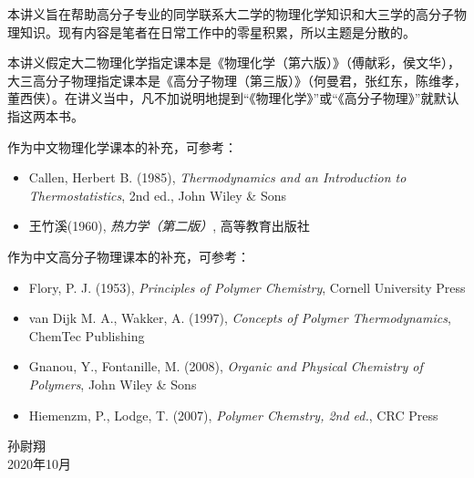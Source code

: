 \documentclass[main.tex]{subfiles}
\begin{document}
本讲义旨在帮助高分子专业的同学联系大二学的物理化学知识和大三学的高分子物理知识。现有内容是笔者在日常工作中的零星积累，所以主题是分散的。

本讲义假定大二物理化学指定课本是《物理化学（第六版）》（傅献彩，侯文华），大三高分子物理指定课本是《高分子物理（第三版）》（何曼君，张红东，陈维孝，董西侠）。在讲义当中，凡不加说明地提到“《物理化学》”或“《高分子物理》”就默认指这两本书。

作为中文物理化学课本的补充，可参考：
\begin{itemize}
\item Callen, Herbert B. (1985), \emph{Thermodynamics and an Introduction to Thermostatistics}, 2nd ed., John Wiley \& Sons
\item 王竹溪(1960), \emph{热力学（第二版）}, 高等教育出版社
\end{itemize}
作为中文高分子物理课本的补充，可参考：
\begin{itemize}
\item Flory, P. J. (1953), \emph{Principles of Polymer Chemistry}, Cornell University Press
\item van Dijk M. A., Wakker, A. (1997), \emph{Concepts of Polymer Thermodynamics}, ChemTec Publishing
    \item Gnanou, Y., Fontanille, M. (2008), \emph{Organic and Physical Chemistry of Polymers}, John Wiley \& Sons
    \item Hiemenzm, P., Lodge, T. (2007), \emph{Polymer Chemstry, 2nd ed.}, CRC Press
\end{itemize}



\begin{flushright}
孙尉翔\\
2020年10月
\end{flushright}
\end{document}
